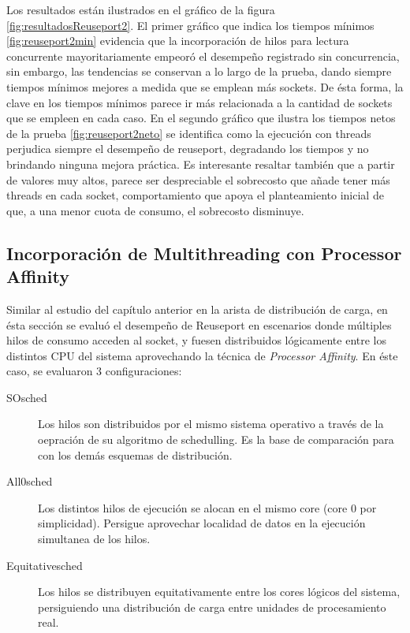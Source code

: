 Los resultados están ilustrados en el gráfico de la figura \ref{fig:resultadosReuseport2}. El primer gráfico que indica los tiempos mínimos \ref{fig:reuseport2min} evidencia que la incorporación de hilos para lectura concurrente mayoritariamente empeoró el desempeño registrado sin concurrencia, sin embargo, las tendencias se conservan a lo largo de la prueba, dando siempre tiempos mínimos mejores a medida que se emplean más sockets. De ésta forma, la clave en los tiempos mínimos parece ir más relacionada a la cantidad de sockets que se empleen en cada caso. En el segundo gráfico que ilustra los tiempos netos de la prueba \ref{fig:reuseport2neto} se identifica como la ejecución con threads perjudica siempre el desempeño de reuseport, degradando los tiempos y no brindando ninguna mejora práctica. Es interesante resaltar también que a partir de valores muy altos, parece ser despreciable el sobrecosto que añade tener más threads en cada socket, comportamiento que apoya el planteamiento inicial de que, a una menor cuota de consumo, el sobrecosto disminuye.

\subsection{Incorporación de Multithreading con Processor Affinity}
Similar al estudio del capítulo anterior en la arista de distribución de carga, en ésta sección se evaluó el desempeño de Reuseport en escenarios donde múltiples hilos de consumo acceden al socket, y fuesen distribuidos lógicamente entre los distintos CPU del sistema aprovechando la técnica de \emph{Processor Affinity}. En éste caso, se evaluaron 3 configuraciones:

\begin{description}
\item[SOsched] Los hilos son distribuidos por el mismo sistema operativo a través de la oepración de su algoritmo de schedulling. Es la base de comparación para con los demás esquemas de distribución.
\item[All0sched] Los distintos hilos de ejecución se alocan en el mismo core (core 0 por simplicidad). Persigue aprovechar localidad de datos en la ejecución simultanea de los hilos.
\item[Equitativesched] Los hilos se distribuyen equitativamente entre los cores lógicos del sistema, persiguiendo una distribución de carga entre unidades de procesamiento real.
\end{description}

